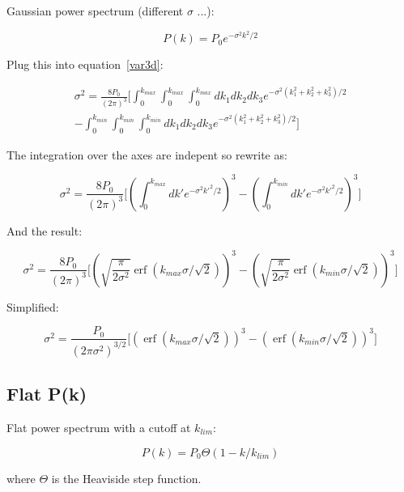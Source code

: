 \documentclass[10pt]{article}
\DeclareMathOperator\erf{erf}
\begin{document}
Gaussian power spectrum (different $\sigma$ ...): 

\begin{equation}
P(k) = P_0 e^{-\sigma^2 k^2 / 2}
\end{equation}

Plug this into equation~\ref{var3d}:

\begin{multline}
\sigma^2 = \frac{8 P_0}{(2\pi)^3} \biggl[ \int_{0}^{k_{max}} \int_{0}^{k_{max}} \int_{0}^{k_{max}} dk_1 dk_2 dk_3 e^{- \sigma^2 (k_1^2 + k_2^2 + k_3^2)/2} \\
 - \int_{0}^{k_{min}} \int_{0}^{k_{min}} \int_{0}^{k_{min}} dk_1 dk_2 dk_3 e^{- \sigma^2 (k_1^2 + k_2^2 + k_3^2)/2} \biggr]
\end{multline}

The integration over the axes are indepent so rewrite as:

\begin{equation}
\sigma^2 = \frac{8 P_0}{(2\pi)^3} \biggl[ \left( \int_{0}^{k_{max}} dk' e^{- \sigma^2 k'^2/2} \right)^3 - \left( \int_{0}^{k_{min}} dk' e^{- \sigma^2 k'^2/2} \right)^3 \biggr]
\end{equation}

And the result:

\begin{equation}
\sigma^2 = \frac{8 P_0}{(2\pi)^3} \biggl[ \left(  \sqrt{\frac{\pi}{2 \sigma^2}} \erf(k_{max} \sigma / \sqrt{2}) \right)^3 - \left(  \sqrt{\frac{\pi}{2 \sigma^2}} \erf(k_{min} \sigma / \sqrt{2}) \right)^3 \biggr]
\end{equation}

Simplified:

\begin{equation}
\sigma^2 = \frac{P_0}{(2\pi \sigma^2)^{3/2}} \biggl[ \left(\erf(k_{max} \sigma / \sqrt{2}) \right)^3 - \left(\erf(k_{min} \sigma / \sqrt{2}) \right)^3 \biggr]
\end{equation}

\subsection{Flat P(k)}

Flat power spectrum with a cutoff at $k_{lim}$:

\begin{equation}
P(k) = P_0 \Theta(1- k/k_{lim})
\end{equation}

where $\Theta$ is the Heaviside step function.
\end{document}
